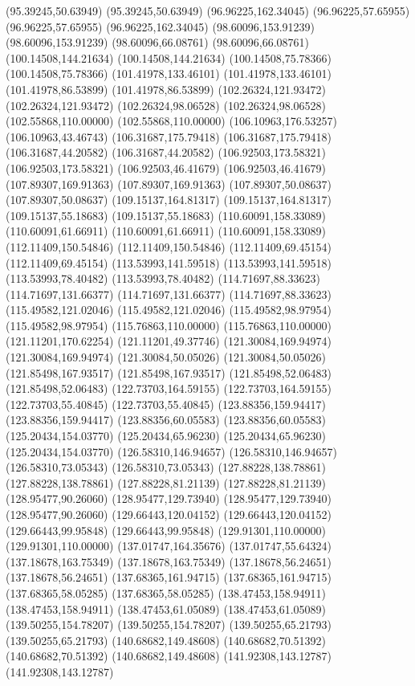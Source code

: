{(95.39245,50.63949) (95.39245,50.63949) (96.96225,162.34045) (96.96225,57.65955) (96.96225,57.65955) (96.96225,162.34045) (98.60096,153.91239) (98.60096,153.91239)
(98.60096,66.08761) (98.60096,66.08761) (100.14508,144.21634) (100.14508,144.21634) (100.14508,75.78366) (100.14508,75.78366) (101.41978,133.46101) (101.41978,133.46101)
(101.41978,86.53899) (101.41978,86.53899) (102.26324,121.93472) (102.26324,121.93472) (102.26324,98.06528) (102.26324,98.06528) (102.55868,110.00000) (102.55868,110.00000)
(106.10963,176.53257) (106.10963,43.46743) (106.31687,175.79418) (106.31687,175.79418) (106.31687,44.20582) (106.31687,44.20582) (106.92503,173.58321) (106.92503,173.58321)
(106.92503,46.41679) (106.92503,46.41679) (107.89307,169.91363) (107.89307,169.91363) (107.89307,50.08637) (107.89307,50.08637) (109.15137,164.81317) (109.15137,164.81317)
(109.15137,55.18683) (109.15137,55.18683) (110.60091,158.33089) (110.60091,61.66911) (110.60091,61.66911) (110.60091,158.33089) (112.11409,150.54846) (112.11409,150.54846)
(112.11409,69.45154) (112.11409,69.45154) (113.53993,141.59518) (113.53993,141.59518) (113.53993,78.40482) (113.53993,78.40482) (114.71697,88.33623) (114.71697,131.66377)
(114.71697,131.66377) (114.71697,88.33623) (115.49582,121.02046) (115.49582,121.02046) (115.49582,98.97954) (115.49582,98.97954) (115.76863,110.00000) (115.76863,110.00000)
(121.11201,170.62254) (121.11201,49.37746) (121.30084,169.94974) (121.30084,169.94974) (121.30084,50.05026) (121.30084,50.05026) (121.85498,167.93517) (121.85498,167.93517)
(121.85498,52.06483) (121.85498,52.06483) (122.73703,164.59155) (122.73703,164.59155) (122.73703,55.40845) (122.73703,55.40845) (123.88356,159.94417) (123.88356,159.94417)
(123.88356,60.05583) (123.88356,60.05583) (125.20434,154.03770) (125.20434,65.96230) (125.20434,65.96230) (125.20434,154.03770) (126.58310,146.94657) (126.58310,146.94657)
(126.58310,73.05343) (126.58310,73.05343) (127.88228,138.78861) (127.88228,138.78861) (127.88228,81.21139) (127.88228,81.21139) (128.95477,90.26060) (128.95477,129.73940)
(128.95477,129.73940) (128.95477,90.26060) (129.66443,120.04152) (129.66443,120.04152) (129.66443,99.95848) (129.66443,99.95848) (129.91301,110.00000) (129.91301,110.00000)
(137.01747,164.35676) (137.01747,55.64324) (137.18678,163.75349) (137.18678,163.75349) (137.18678,56.24651) (137.18678,56.24651) (137.68365,161.94715) (137.68365,161.94715)
(137.68365,58.05285) (137.68365,58.05285) (138.47453,158.94911) (138.47453,158.94911) (138.47453,61.05089) (138.47453,61.05089) (139.50255,154.78207) (139.50255,154.78207)
(139.50255,65.21793) (139.50255,65.21793) (140.68682,149.48608) (140.68682,70.51392) (140.68682,70.51392) (140.68682,149.48608) (141.92308,143.12787) (141.92308,143.12787)
}
